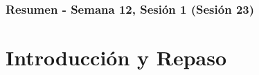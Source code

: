 \documentclass[10pt]{beamer}
\begin{document}
\myfront{}

\begin{frame}
  \titlepage
\end{frame}

\begin{frame}
  \frametitle{Resumen - Semana 12, Sesión 1 (Sesión 23)}
  \tableofcontents
\end{frame}


\section{Introducción y Repaso}
\end{document}
